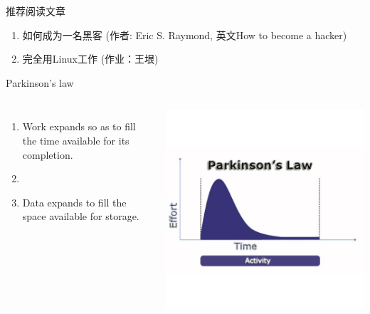 \documentclass[xcolor=svgnames]{beamer}
\begin{document}
\begin{CJK*}{UTF8}{gbsn}
\begin{frame}{推荐阅读文章}
\begin{enumerate}
\item 如何成为一名黑客 (作者: Eric S. Raymond, 英文How to become a hacker)
\item 完全用Linux工作  (作业：王垠)
\end{enumerate}
\end{frame}

\begin{frame}{Parkinson's law}
\begin{columns}%
\begin{enumerate}
\item Work expands so as to fill the time available for its completion.
\item[]
\item Data expands to fill the space available for storage.
\end{enumerate}
\includegraphics[width=1.0\textwidth]{parkinson.jpg}
\end{columns}%
\end{frame}


\end{CJK*}
\end{document}
